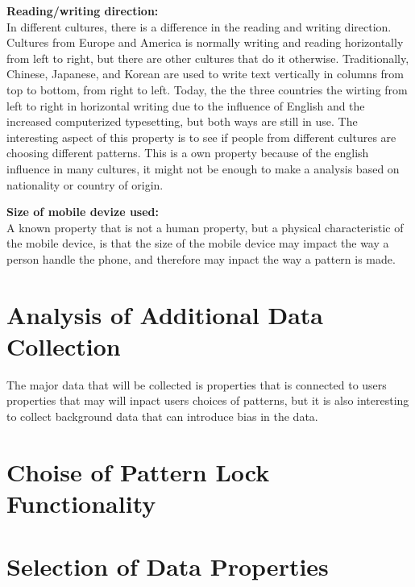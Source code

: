     {\bf Reading/writing direction:} \\
    In different cultures, there is a difference in the reading and writing direction. Cultures from Europe and America is normally writing and reading horizontally from left to right, but there are other cultures that do it otherwise. Traditionally, Chinese, Japanese, and Korean are used to write text vertically in columns from top to bottom, from right to left. Today, the the three countries the wirting from left to right in horizontal writing due to the influence of English and the increased computerized typesetting, but both ways are still in use. The interesting aspect of this property is to see if people from different cultures are choosing different patterns. This is a own property because of the english influence in many cultures, it might not be enough to make a analysis based on nationality or country of origin. 

    {\bf Size of mobile devize used:} \\
    A known property that is not a human property, but a physical characteristic of the mobile device, is that the size of the mobile device may impact the way a person handle the phone, and therefore may inpact the way a pattern is made.



  \section{Analysis of Additional Data Collection}
  The major data that will be collected is properties that is connected to users properties that may will inpact users choices of patterns, but it is also interesting to collect background data that can introduce bias in the data. 



  \section{Choise of Pattern Lock Functionality}

  \section{Selection of Data Properties}





